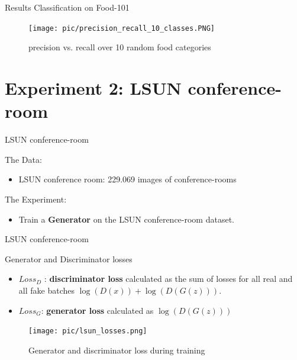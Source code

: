 \documentclass[10pt]{beamer}
\begin{document}
{
\begin{frame}{Results Classification on Food-101}
\begin{figure}[htbp] 
  \centering
     \texttt{[image: pic/precision\_recall\_10\_classes.PNG]}
  \caption{precision vs. recall over 10 random food categories }
  \label{fig:Bild1}
\end{figure}
\end{frame}
}

\section{Experiment 2: LSUN conference-room}

{
\begin{frame}{LSUN conference-room}
      \begin{block}{The Data:}
	\begin{itemize}
    \item LSUN conference room: 229.069 images of conference-rooms
  \end{itemize}
    \end{block}
        \begin{block}{The Experiment:}
	\begin{itemize}
	\item Train a \textbf{Generator} on the LSUN conference-room dataset. 
  \end{itemize}
    \end{block}
\end{frame}
}

{
\begin{frame}{LSUN conference-room}
      \begin{block}{Generator and Discriminator losses}
	\begin{itemize}[<+- | alert@+>]
    \item \textbf{$Loss_D$} : \textbf{discriminator loss} calculated as the sum of losses for all real and all fake batches $ \log(D(x))+\log(D(G(z)))$.
    \item \textbf{$Loss_G$}: \textbf{generator loss} calculated as $\log(D(G(z)))$
  \end{itemize}
    \end{block}   
\begin{figure}[htbp] 
  \centering
     \texttt{[image: pic/lsun\_losses.png]}
  \caption{Generator and discriminator loss during training }
  \label{fig:Bild1}
\end{figure} 
\end{frame}
}
\end{document}
